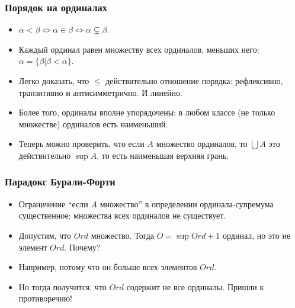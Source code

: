 \documentclass[10pt]{beamer}
\begin{document}
\begin{frame}
    \frametitle{Порядок на ординалах}
    \begin{itemize}
        \item $\alpha < \beta \Leftrightarrow \alpha \in \beta \Leftrightarrow \alpha \subsetneq \beta$.
        \item Каждый ординал равен множеству всех ординалов, меньших него: $\alpha = \{\beta | \beta < \alpha\}$.
        \item Легко доказать, что $\leq$ действительно отношение порядка: рефлексивно, транзитивно и антисимметрично. И линейно.
        \item Более того, ординалы вполне упорядочены: в любом классе (не только множестве) ординалов есть наименьший.
        \item Теперь можно проверить, что если $A$ множество ординалов, то $\bigcup A$ это действительно $\sup A$, то есть наименьшая верхняя грань.
    \end{itemize}
\end{frame}

\begin{frame}
    \frametitle{Парадокс Бурали-Форти}
    \begin{itemize}
        \item Ограничение \enquote{если $A$ множество} в определении ординала-супремума существенное: множества всех ординалов не существует.
        \item Допустим, что $Ord$ множество. Тогда $O = \sup Ord + 1$ ординал, но это не элемент $Ord$. Почему? \pause
        \item Например, потому что он больше всех элементов $Ord$. \pause
        \item Но тогда получится, что $Ord$ содержит не все ординалы. Пришли к противоречию!
    \end{itemize}
\end{frame}
\end{document}
